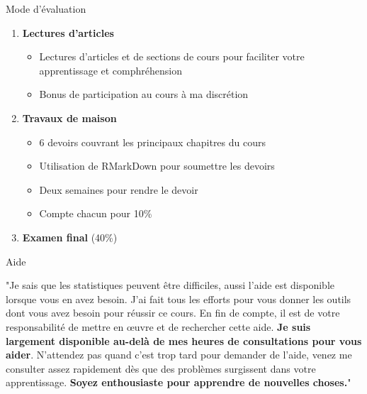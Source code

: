 \documentclass[xcolor=table]{beamer}
\begin{document}
\begin{frame}{Mode d'évaluation}

\begin{enumerate}
\item \textbf{Lectures d'articles}
	\begin{itemize}
	\item Lectures d'articles et de sections de cours pour faciliter votre apprentissage et comphréhension
    \item Bonus de participation au cours à ma discrétion
	\end{itemize}
    
\item \textbf{Travaux de maison}
	\begin{itemize}
		\item 6 devoirs couvrant les principaux chapitres du cours
        \item Utilisation de RMarkDown pour soumettre les devoirs
        \item Deux semaines pour rendre le devoir
        \item Compte chacun pour 10\%
	\end{itemize}    
\item \textbf{Examen final} (40\%)    

\end{enumerate}
\end{frame}
\begin{frame}{Aide}

\centering
"Je sais que les statistiques peuvent être difficiles, aussi l'aide est disponible lorsque vous en avez besoin. J’ai fait tous les efforts pour vous donner les outils dont vous avez besoin pour réussir ce cours. En fin de compte, il est de votre responsabilité de mettre en œuvre et de rechercher cette aide. \textbf{Je suis largement disponible au-delà de mes heures de consultations pour vous aider}. N’attendez pas quand c’est trop tard pour demander de l’aide, venez me consulter assez rapidement dès que des problèmes surgissent dans votre apprentissage. \textbf{Soyez enthousiaste pour apprendre de nouvelles choses.}"

\end{frame}
\end{document}
